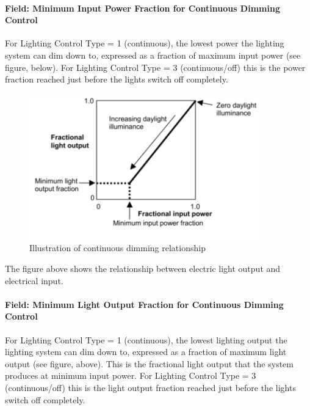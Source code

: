 \paragraph{Field: Minimum Input Power Fraction for Continuous Dimming Control}\label{field-minimum-input-power-fraction-for-continuous-dimming-control}

For Lighting Control Type = 1 (continuous), the lowest power the lighting system can dim down to, expressed as a fraction of maximum input power (see figure, below). For Lighting Control Type = 3 (continuous/off) this is the power fraction reached just before the lights switch off completely.

\begin{figure}[hbtp] %
\centering
\includegraphics[width=0.9\textwidth, height=0.9\textheight, keepaspectratio=true]{media/image096.png}
\caption{Illustration of continuous dimming relationship \protect \label{fig:illustration-of-continuous-dimming}}
\end{figure}

The figure above shows the relationship between electric light output and electrical input.

\paragraph{Field: Minimum Light Output Fraction for Continuous Dimming Control}\label{field-minimum-light-output-fraction-for-continuous-dimming-control}

For Lighting Control Type = 1 (continuous), the lowest lighting output the lighting system can dim down to, expressed as a fraction of maximum light output (see figure, above). This is the fractional light output that the system produces at minimum input power. For Lighting Control Type = 3 (continuous/off) this is the light output fraction reached just before the lights switch off completely.

